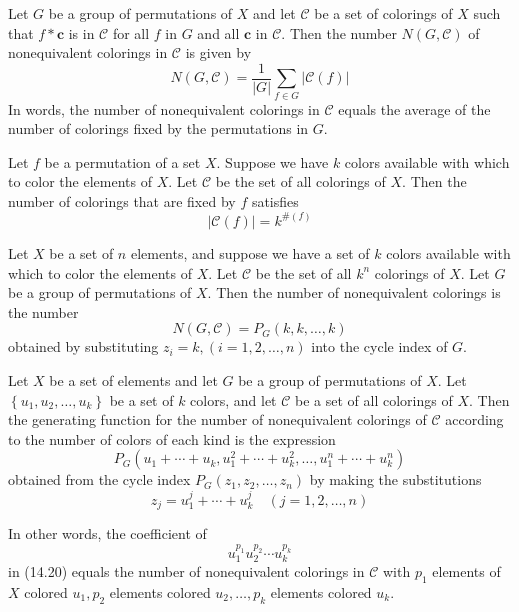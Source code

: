 \begin{theorem}
  \label{thm:14.2.3}
  Let $G$ be a group of permutations of $X$ and let $\mathcal{C}$ be a set of colorings of $X$ such that $f * \mathbf{c}$ is in $\mathcal{C}$ for all $f$ in $G$ and all $\mathbf{c}$ in $\mathcal{C}$. Then the number $N(G, \mathcal{C})$ of nonequivalent colorings in $\mathcal{C}$ is given by
  \begin{equation}\label{14.7}
    N(G, \mathcal{C})=\frac{1}{|G|} \sum_{f \in G}|\mathcal{C}(f)|
  \end{equation}
  In words, the number of nonequivalent colorings in $\mathcal{C}$ equals the average of the number of colorings fixed by the permutations in $G$.   
\end{theorem}

\begin{theorem}
  \label{thm:14.3.1}
  Let $f$ be a permutation of a set $X$. Suppose we have $k$ colors available with which to color the elements of $X$. Let $\mathcal{C}$ be the set of all colorings of $X$. Then the number of colorings that are fixed by $f$ satisfies
  $$
  |\mathcal{C}(f)|=k^{\#(f)}
  $$
\end{theorem}

\begin{theorem}
  \label{thm:14.3.2}
  Let $X$ be a set of $n$ elements, and suppose we have a set of $k$ colors available with which to color the elements of $X$. Let $\mathcal{C}$ be the set of all $k^n$ colorings of $X$. Let $G$ be a group of permutations of $X$. Then the number of nonequivalent colorings is the number
  $$
  N(G, \mathcal{C})=P_G(k, k, \ldots, k)
  $$
  obtained by substituting $z_i=k,(i=1,2, \ldots, n)$ into the cycle index of $G$.
\end{theorem}

\begin{theorem}
  \label{thm:14.3.3}
  Let $X$ be a set of elements and let $G$ be a group of permutations of $X$. Let $\left\{u_1, u_2, \ldots, u_k\right\}$ be a set of $k$ colors, and let $\mathcal{C}$ be a set of all colorings of $X$. Then the generating function for the number of nonequivalent colorings of $\mathcal{C}$ according to the number of colors of each kind is the expression
  \begin{equation}\label{14.20}
    P_G\left(u_1+\cdots+u_k, u_1^2+\cdots+u_k^2, \ldots, u_1^n+\cdots+u_k^n\right)
  \end{equation}
  obtained from the cycle index $P_G\left(z_1, z_2, \ldots, z_n\right)$ by making the substitutions
  $$
  z_j=u_1^j+\cdots+u_k^j \quad(j=1,2, \ldots, n)
  $$

  In other words, the coefficient of
  $$
  u_1^{p_1} u_2^{p_2} \cdots u_k^{p_k}
  $$
  in (14.20) equals the number of nonequivalent colorings in $\mathcal{C}$ with $p_1$ elements of $X$ colored $u_1, p_2$ elements colored $u_2, \ldots, p_k$ elements colored $u_k$.
\end{theorem} 


















